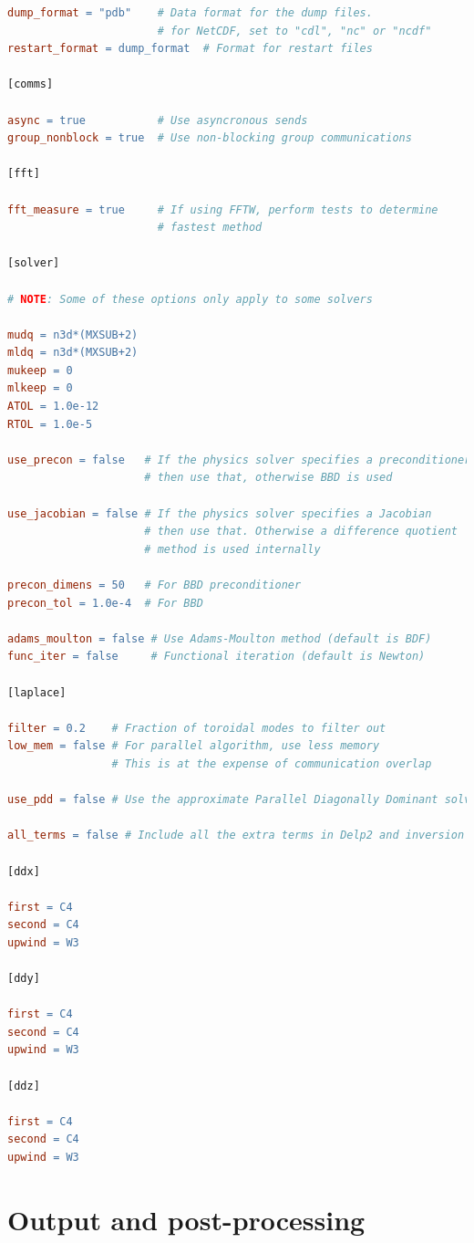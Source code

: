 \documentclass[12pt]{article}
\begin{document}
\begin{lstlisting}[language=make,numbers=none]
dump_format = "pdb"    # Data format for the dump files.
                       # for NetCDF, set to "cdl", "nc" or "ncdf"
restart_format = dump_format  # Format for restart files

[comms]

async = true           # Use asyncronous sends
group_nonblock = true  # Use non-blocking group communications

[fft]

fft_measure = true     # If using FFTW, perform tests to determine
                       # fastest method

[solver]

# NOTE: Some of these options only apply to some solvers

mudq = n3d*(MXSUB+2)
mldq = n3d*(MXSUB+2)
mukeep = 0
mlkeep = 0
ATOL = 1.0e-12
RTOL = 1.0e-5

use_precon = false   # If the physics solver specifies a preconditioner
                     # then use that, otherwise BBD is used

use_jacobian = false # If the physics solver specifies a Jacobian
                     # then use that. Otherwise a difference quotient
                     # method is used internally

precon_dimens = 50   # For BBD preconditioner
precon_tol = 1.0e-4  # For BBD

adams_moulton = false # Use Adams-Moulton method (default is BDF)
func_iter = false     # Functional iteration (default is Newton)

[laplace]

filter = 0.2    # Fraction of toroidal modes to filter out
low_mem = false # For parallel algorithm, use less memory
                # This is at the expense of communication overlap

use_pdd = false # Use the approximate Parallel Diagonally Dominant solver 

all_terms = false # Include all the extra terms in Delp2 and inversion

[ddx]

first = C4
second = C4
upwind = W3

[ddy]

first = C4
second = C4
upwind = W3

[ddz]

first = C4
second = C4
upwind = W3
\end{lstlisting}
%


\section{Output and post-processing}
\label{sec:output}
\end{document}
